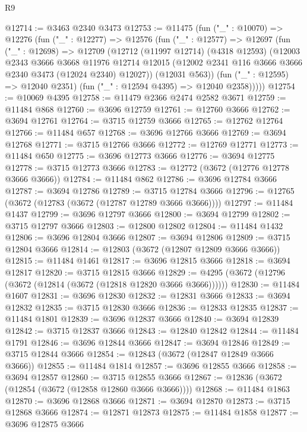 \begin{lexlean}{R9}
\begin{coremodule}
@12714 := @3463 @2340 @3473
@12753 := @11475
    (fun ("_" : @10070) =>
    @12276
      (fun ("_" : @12277) =>
      @12576
        (fun ("_" : @12577) =>
        @12697
          (fun ("_" : @12698) =>
          @12709
            (@12712
              (@11997 @12714)
              (@4318 @12593)
              (@12003
                @2343
                @3666
                @3668
                @11976
                @12714
                @12015
                (@12002 @2341 @116 @3666 @3666 @2340 @3473 (@12024 @2340) @12027))
              (@12031 @563))
            (fun ("_" : @12595) => @12040 @2351)
            (fun ("_" : @12594 @4395) => @12040 @2358)))))
@12754 := @10069 @4395
@12758 := @11479 @2366 @2474 @2582 @3671
@12759 := @11484 @868
@12760 := @3696 @12759
@12761 := @12760 @3666
@12762 := @3694 @12761
@12764 := @3715 @12759 @3666
@12765 := @12762 @12764
@12766 := @11484 @657
@12768 := @3696 @12766 @3666
@12769 := @3694 @12768
@12771 := @3715 @12766 @3666
@12772 := @12769 @12771
@12773 := @11484 @650
@12775 := @3696 @12773 @3666
@12776 := @3694 @12775
@12778 := @3715 @12773 @3666
@12783 := @12772 (@3672 (@12776 @12778 @3666 @3666))
@12784 := @11484 @862
@12786 := @3696 @12784 @3666
@12787 := @3694 @12786
@12789 := @3715 @12784 @3666
@12796 := @12765 (@3672 (@12783 (@3672 (@12787 @12789 @3666 @3666))))
@12797 := @11484 @1437
@12799 := @3696 @12797 @3666
@12800 := @3694 @12799
@12802 := @3715 @12797 @3666
@12803 := @12800 @12802
@12804 := @11484 @1432
@12806 := @3696 @12804 @3666
@12807 := @3694 @12806
@12809 := @3715 @12804 @3666
@12814 := @12803 (@3672 (@12807 @12809 @3666 @3666))
@12815 := @11484 @1461
@12817 := @3696 @12815 @3666
@12818 := @3694 @12817
@12820 := @3715 @12815 @3666
@12829 := @4295 (@3672 (@12796 (@3672 (@12814 (@3672 (@12818 @12820 @3666 @3666))))))
@12830 := @11484 @1607
@12831 := @3696 @12830
@12832 := @12831 @3666
@12833 := @3694 @12832
@12835 := @3715 @12830 @3666
@12836 := @12833 @12835
@12837 := @11484 @1801
@12839 := @3696 @12837 @3666
@12840 := @3694 @12839
@12842 := @3715 @12837 @3666
@12843 := @12840 @12842
@12844 := @11484 @1791
@12846 := @3696 @12844 @3666
@12847 := @3694 @12846
@12849 := @3715 @12844 @3666
@12854 := @12843 (@3672 (@12847 @12849 @3666 @3666))
@12855 := @11484 @1814
@12857 := @3696 @12855 @3666
@12858 := @3694 @12857
@12860 := @3715 @12855 @3666
@12867 := @12836 (@3672 (@12854 (@3672 (@12858 @12860 @3666 @3666))))
@12868 := @11484 @1863
@12870 := @3696 @12868 @3666
@12871 := @3694 @12870
@12873 := @3715 @12868 @3666
@12874 := @12871 @12873
@12875 := @11484 @1858
@12877 := @3696 @12875 @3666

\end{coremodule}
\end{lexlean}
